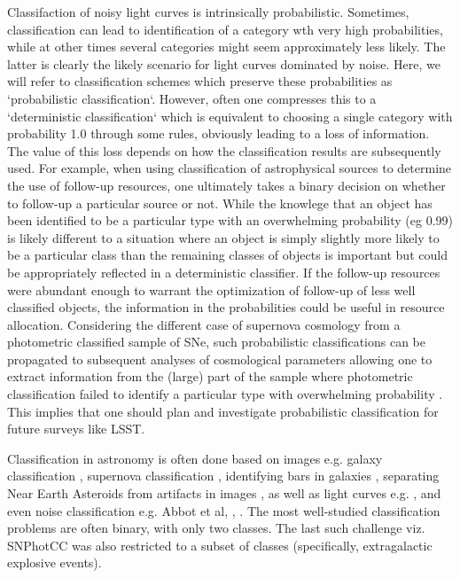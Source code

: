 Classifaction of noisy light curves is intrinsically probabilistic.
Sometimes, classification can lead to identification of a category wth very high probabilities, while at other times several categories might seem approximately less likely. The latter is clearly the likely scenario for light curves dominated by noise.
Here, we will refer to classification schemes which preserve these probabilities as `probabilistic classification`.
However, often one compresses this to a `deterministic classification` which is equivalent to choosing a single category with probability 1.0 through some rules, obviously leading to a loss of information.
The value of this loss depends on how the classification results are subsequently used.
For example, when using classification of astrophysical sources to determine the use of follow-up resources, one ultimately takes a binary decision on whether to follow-up a particular source or not.
While the knowlege that an object has been identified to be a particular type with an overwhelming probability (eg 0.99) is likely different to a situation where an object is simply slightly more likely to be a particular class than the remaining classes of objects is important but could be appropriately reflected in a deterministic classifier.
If the follow-up resources were abundant enough to warrant the optimization of follow-up of less well classified objects, the information in the probabilities could be useful in resource allocation.
Considering the different case of supernova cosmology from a photometric classified sample of SNe, such probabilistic classifications can be propagated to subsequent analyses of cosmological parameters allowing one to extract information from the (large) part of the sample where photometric classification failed to identify a particular type with overwhelming probability \cite{roberts_zbeams:_2017}.
This implies that one should plan and investigate probabilistic classification for future surveys like LSST.

Classification in astronomy is often done based on images e.g. galaxy classification \cite{2016A&C....16...34H}, supernova classification \cite{2017ApJ...836...97C}, identifying bars in galaxies \cite{2018MNRAS.477..894A}, separating Near Earth Asteroids from artifacts in images \cite{2016PASJ...68..104M}, as well as light curves e.g. \cite{2016PASJ...68..104M,2017arXiv170906257M,2017CQGra..34f4003Z}, and even noise classification e.g. Abbot et al, \cite{2017CQGra..34f4003Z}, \cite{2018PhRvD..97j1501G}.
The most well-studied classification problems are often binary, with only two classes.
The last such challenge viz. SNPhotCC was also restricted to a subset of classes (specifically, extragalactic explosive events).

